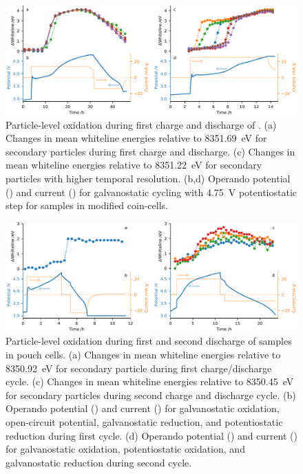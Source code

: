 \documentclass{article}
\begin{document}
\begin{figure}
  \includegraphics[width=\textwidth]{figures/NMC333-particle-echem.pdf}
  \caption{Particle-level oxidation during first charge and discharge
    of \nmc[333]{}. (a) Changes in mean whiteline energies relative to
    \SI{8351.69}{eV} for secondary particles during first charge and
    discharge. (c) Changes in mean whiteline energies relative to
    \SI{8351.22}{eV} for secondary particles with higher temporal
    resolution. (b,d) Operando potential (\textcolor{C0}{\mplline{}})
    and current (\textcolor{C1}{\mplline{}}) for galvanostatic cycling
    with \SI{4.75}{V} potentiostatic step for \nmc[333]{} samples in
    modified coin-cells.}
  \label{fig:nmc333-particles}
\end{figure}

\begin{figure}
  \includegraphics[width=\textwidth]{figures/NCA-particle-echem.pdf}
  \caption{Particle-level oxidation during first and second discharge
    of \nca{} samples in pouch cells. (a) Changes in mean whiteline
    energies relative to \SI{8350.92}{eV} for secondary particle
    during first charge/discharge cycle. (c) Changes in mean whiteline
    energies relative to \SI{8350.45}{eV} for secondary particles
    during second charge and discharge cycle. (b) Operando potential
    (\textcolor{C0}{\mplline{}}) and current
    (\textcolor{C1}{\mplline{}}) for galvanostatic oxidation,
    open-circuit potential, galvanostatic reduction, and
    potentiostatic reduction during first cycle. (d) Operando
    potential (\textcolor{C0}{\mplline{}}) and current
    (\textcolor{C1}{\mplline{}}) for galvanostatic oxidation,
    potentiostatic oxidation, and galvanostatic reduction during
    second cycle.}
  \label{fig:nca-particles}
\end{figure}
\end{document}
